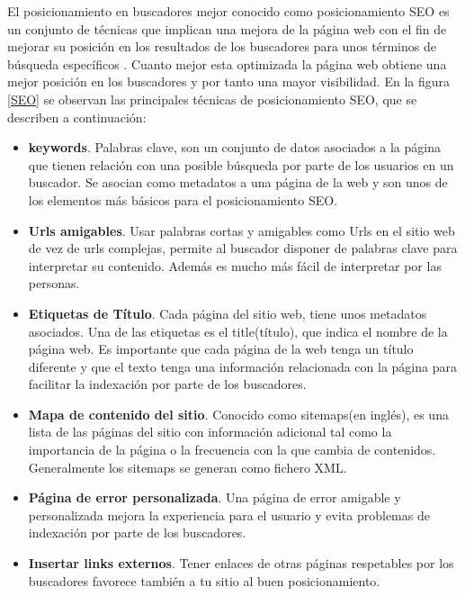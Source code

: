 El posicionamiento en buscadores mejor conocido como posicionamiento SEO es un conjunto de técnicas que implican una mejora de la página web con el fin de mejorar su posición en los resultados de los buscadores para unos términos de búsqueda específicos \cite{SEO}. Cuanto mejor esta optimizada la página web obtiene una mejor posición en los buscadores y por tanto una mayor visibilidad. En la figura \ref{SEO} se observan las principales técnicas de posicionamiento SEO, que se describen a continuación:

\begin{itemize}

\item \textbf{keywords}. Palabras clave, son un conjunto de datos asociados a la página que tienen relación con una posible búsqueda por parte de los usuarios en un buscador. Se asocian como metadatos a una página de la web y son unos de los elementos más básicos para el posicionamiento SEO.

\item \textbf{Urls amigables}. Usar palabras cortas y amigables como Urls en el sitio web de vez de urls complejas, permite al buscador disponer de palabras clave para interpretar su contenido. Además es mucho más fácil de interpretar por las personas.

\item \textbf{Etiquetas de Título}. Cada página del sitio web, tiene unos metadatos asociados. Una de las etiquetas es el title(título), que indica el nombre de la página web. Es importante que cada página de la web tenga un título diferente y que el texto tenga una información relacionada con la página para facilitar la indexación por parte de los buscadores.

\item \textbf{Mapa de contenido del sitio}. Conocido como sitemaps(en inglés), es una lista de las páginas del sitio con información adicional tal como la importancia de la página o la frecuencia con la que cambia de contenidos. Generalmente los sitemaps se generan como fichero XML.

\item \textbf{Página de error personalizada}. Una página de error amigable y personalizada mejora la experiencia para el usuario y evita problemas de indexación por parte de los buscadores.

\item \textbf{Insertar links externos}. Tener enlaces de otras páginas respetables por los buscadores favorece también a tu sitio al buen posicionamiento.


\end{itemize}
